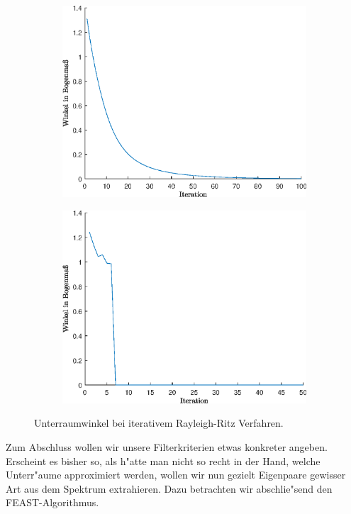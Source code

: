 \begin{figure}[h!]
\center
\begin{subfigure}[c]{.4\textwidth}
\includegraphics[width=.9\linewidth]{images/iterRRDistConstant}
\end{subfigure}
\begin{subfigure}[c]{.4\textwidth}
\includegraphics[width=.9\linewidth]{images/iterRRDistIncreasing}
\end{subfigure}
\caption{Unterraumwinkel bei iterativem Rayleigh-Ritz Verfahren.}\label{chap1:im:catinterval}
\end{figure}

\newpage


Zum Abschluss wollen wir unsere Filterkriterien etwas konkreter angeben. Erscheint es bisher so, als h"atte man nicht so recht in der Hand, welche Unterr"aume approximiert werden, wollen wir nun gezielt Eigenpaare gewisser Art aus dem Spektrum extrahieren. Dazu betrachten wir abschlie"send den FEAST-Algorithmus.

